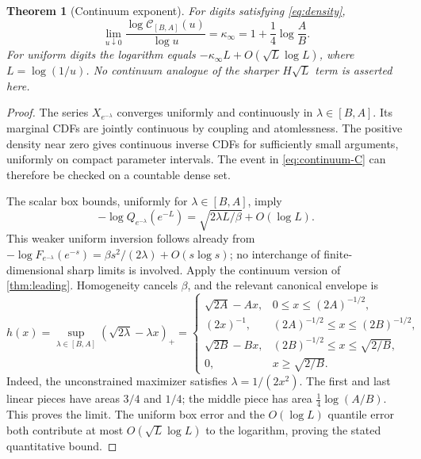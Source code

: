 \documentclass[11pt,a4paper]{article}
\newtheorem{theorem}{Theorem}[section]
\theoremstyle{definition}
\theoremstyle{remark}
\newcommand{\pos}[1]{\left(#1\right)_+}
\numberwithin{equation}{section}
\begin{document}
\begin{theorem}[Continuum exponent]
\label{thm:continuum}
For digits satisfying \eqref{eq:density},
\begin{equation}
 \boxed{\qquad
 \lim_{u\downarrow0}
 \frac{\log\mathcal C_{[B,A]}(u)}{\log u}
 =\kappa_\infty=1+\frac14\log\frac AB.
 \qquad}
 \label{eq:kappa-infty}
\end{equation}
For uniform digits the logarithm equals
$-\kappa_\infty L+O(\sqrt L\log L)$, where $L=\log(1/u)$.
No continuum analogue of the sharper $H\sqrt L$ term is asserted here.
\end{theorem}
\begin{proof}
The series $X_{e^{-\lambda}}$ converges uniformly and continuously in
$\lambda\in[B,A]$. Its marginal CDFs are jointly continuous by coupling
and atomlessness. The positive density near zero gives continuous inverse
CDFs for sufficiently small arguments, uniformly on compact parameter
intervals. The event in \eqref{eq:continuum-C} can therefore be checked on
a countable dense set.

The scalar box bounds, uniformly for $\lambda\in[B,A]$, imply
\[
 -\log Q_{e^{-\lambda}}(e^{-L})
 =\sqrt{2\lambda L/\beta}+O(\log L).
\]
This weaker uniform inversion follows already from
$-\log F_{e^{-\lambda}}(e^{-s})=\beta s^2/(2\lambda)+O(s\log s)$;
no interchange of finite-dimensional sharp limits is involved. Apply the
continuum version of \cref{thm:leading}. Homogeneity cancels $\beta$,
and the relevant canonical envelope is
\begin{equation}
 h(x)=\sup_{\lambda\in[B,A]}\pos{\sqrt{2\lambda}-\lambda x}
 =\begin{cases}
 \sqrt{2A}-Ax,&0\le x\le(2A)^{-1/2},\\
 (2x)^{-1},&(2A)^{-1/2}\le x\le(2B)^{-1/2},\\
 \sqrt{2B}-Bx,&(2B)^{-1/2}\le x\le\sqrt{2/B},\\
 0,&x\ge\sqrt{2/B}.
 \end{cases}
 \label{eq:continuum-envelope}
\end{equation}
Indeed, the unconstrained maximizer satisfies
$\lambda=1/(2x^2)$. The first and last linear pieces have areas $3/4$
and $1/4$; the middle piece has area $\tfrac14\log(A/B)$.
This proves the limit. The uniform box error and the $O(\log L)$
quantile error both contribute at most $O(\sqrt L\log L)$ to the
logarithm, proving the stated quantitative bound.
\end{proof}
\end{document}
